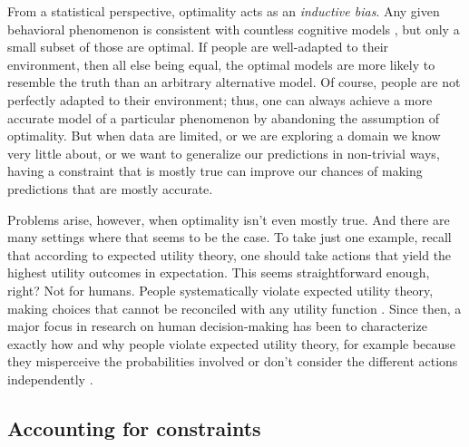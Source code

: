 From a statistical perspective, optimality acts as an \emph{inductive bias}. Any given behavioral phenomenon is consistent with countless cognitive models \citep{anderson1978arguments}, but only a small subset of those are optimal. If people are well-adapted to their environment, then all else being equal, the optimal models are more likely to resemble the truth than an arbitrary alternative model. Of course, people are not perfectly adapted to their environment; thus, one can always achieve a more accurate model of a particular phenomenon by abandoning the assumption of optimality. But when data are limited, or we are exploring a domain we know very little about, or we want to generalize our predictions in non-trivial ways, having a constraint that is mostly true can improve our chances of making predictions that are mostly accurate.

Problems arise, however, when optimality isn't even mostly true. And there are many settings where that seems to be the case. To take just one example, recall that according to expected utility theory, one should take actions that yield the highest utility outcomes in expectation. This seems straightforward enough, right? Not for humans. People systematically violate expected utility theory, making choices that cannot be reconciled with any utility function \citep{allais1953comportement,ellsberg1961risk,kahneman1979prospect}. Since then, a major focus in research on human decision-making has been to characterize exactly how and why people violate expected utility theory, for example because they misperceive the probabilities involved \citep{kahneman1979prospect} or don't consider the different actions independently \citep{roe2001multialternative}.

\subsection{Accounting for constraints}\label{sec:intro-constraints}

